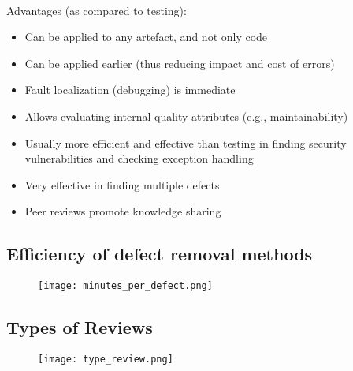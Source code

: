 \documentclass[../ESOF_notes.tex]{subfiles}
\begin{document}
        \paragraph{}
        Advantages (as compared to testing): 
        \begin{itemize}
            \item Can be applied to any artefact, and not only code
            \item Can be applied earlier (thus reducing impact and cost of errors)
            \item Fault localization (debugging) is immediate
            \item Allows evaluating internal quality attributes (e.g., maintainability)
            \item Usually more efficient and effective than testing in finding security
            vulnerabilities and checking exception handling
            \item Very effective in finding multiple defects
            \item Peer reviews promote knowledge sharing
        \end{itemize}

        \subsection{Efficiency of defect removal methods}
            \begin{figure}[h!]
                \centering
                \texttt{[image: minutes\_per\_defect.png]}
            \end{figure}
\pagebreak
        \subsection{Types of Reviews}
            \begin{figure}[h!]
                \centering
                \texttt{[image: type\_review.png]}
            \end{figure}
\end{document}
